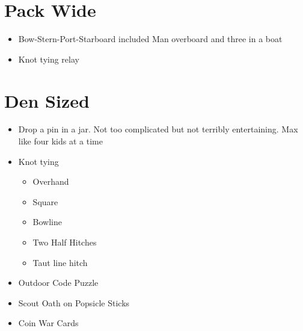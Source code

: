 \documentclass{exam}
\begin{document}
\section{Pack Wide}
\begin{itemize}
\item Bow-Stern-Port-Starboard included Man overboard and three in a boat
\item Knot tying relay
\end{itemize}
\section{Den Sized}
\begin{itemize}
\item Drop a pin in a jar.  Not too complicated but not terribly entertaining.  Max like four kids at a time
\item Knot tying
\begin{itemize}
\item Overhand
\item Square
\item Bowline
\item Two Half Hitches
\item Taut line hitch
\end{itemize}
\item Outdoor Code Puzzle
\item Scout Oath on Popsicle Sticks
\item Coin War Cards
\end{itemize}
\end{document}
